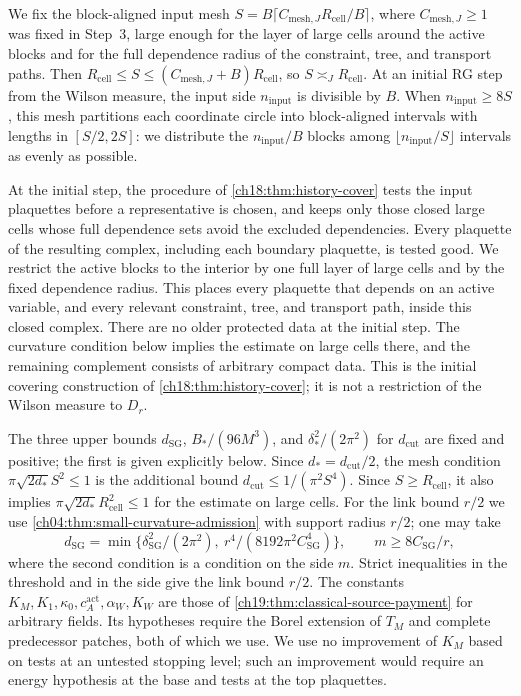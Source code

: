 We fix the block-aligned input mesh $S=B\lceil C_{\mathrm{mesh},J}R_{\mathrm{cell}}/B\rceil$, where $C_{\mathrm{mesh},J}\ge1$ was fixed in Step~3, large enough for the layer of large cells around the active blocks and for the full dependence radius of the constraint, tree, and transport paths. Then $R_{\mathrm{cell}}\le S\le(C_{\mathrm{mesh},J}+B)R_{\mathrm{cell}}$, so $S\asymp_JR_{\mathrm{cell}}$. At an initial RG step from the Wilson measure, the input side $n_{\mathrm{input}}$ is divisible by $B$. When $n_{\mathrm{input}}\ge8S$, this mesh partitions each coordinate circle into block-aligned intervals with lengths in $[S/2,2S]$: we distribute the $n_{\mathrm{input}}/B$ blocks among $\lfloor n_{\mathrm{input}}/S\rfloor$ intervals as evenly as possible.

At the initial step, the procedure of \cref{ch18:thm:history-cover} tests the input plaquettes before a representative is chosen, and keeps only those closed large cells whose full dependence sets avoid the excluded dependencies. Every plaquette of the resulting complex, including each boundary plaquette, is tested good. We restrict the active blocks to the interior by one full layer of large cells and by the fixed dependence radius. This places every plaquette that depends on an active variable, and every relevant constraint, tree, and transport path, inside this closed complex. There are no older protected data at the initial step. The curvature condition below implies the estimate on large cells there, and the remaining complement consists of arbitrary compact data. This is the initial covering construction of \cref{ch18:thm:history-cover}; it is not a restriction of the Wilson measure to $D_r$.

The three upper bounds $d_{\mathrm{SG}}$, $B_*/(96M^3)$, and $\delta_*^2/(2\pi^2)$ for $d_{\mathrm{cut}}$ are fixed and positive; the first is given explicitly below. Since $d_*=d_{\mathrm{cut}}/2$, the mesh condition $\pi\sqrt{2d_*}S^2\le1$ is the additional bound $d_{\mathrm{cut}}\le1/(\pi^2S^4)$. Since $S\ge R_{\mathrm{cell}}$, it also implies $\pi\sqrt{2d_*}R_{\mathrm{cell}}^2\le1$ for the estimate on large cells. For the link bound $r/2$ we use \cref{ch04:thm:small-curvature-admission} with support radius $r/2$; one may take
\[
 d_{\mathrm{SG}}=\min\{\delta_{\mathrm{SG}}^2/(2\pi^2),\ r^4/(8192\pi^2C_{\mathrm{SG}}^4)\},\qquad m\ge8C_{\mathrm{SG}}/r,
\]
where the second condition is a condition on the side $m$. Strict inequalities in the threshold and in the side give the link bound $r/2$. The constants $K_M,K_1,\kappa_0,c_A^{\mathrm{act}},\alpha_W,K_W$ are those of \cref{ch19:thm:classical-source-payment} for arbitrary fields. Its hypotheses require the Borel extension of $T_M$ and complete predecessor patches, both of which we use. We use no improvement of $K_M$ based on tests at an untested stopping level; such an improvement would require an energy hypothesis at the base and tests at the top plaquettes.

